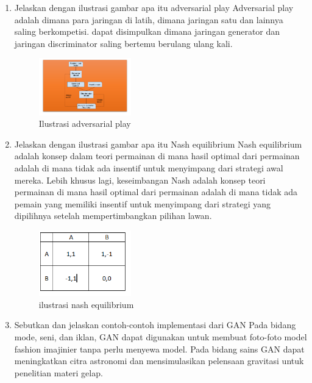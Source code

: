 \begin{enumerate}
	\item Jelaskan dengan ilustrasi gambar apa itu adversarial play
	\hfill\break
	Adversarial play adalah dimana para jaringan di latih, dimana jaringan satu dan lainnya saling berkompetisi. dapat disimpulkan dimana jaringan generator dan jaringan discriminator saling bertemu berulang ulang kali.
	\begin{figure}[H]
	    \centering
	    \includegraphics[width=4cm]{figures/1174096/tugas8/t6.PNG}
	    \caption{Ilustrasi adversarial play}
    \end{figure}

    \item  Jelaskan dengan ilustrasi gambar apa itu Nash equilibrium
    \hfill\break
    Nash equilibrium adalah konsep dalam teori permainan di mana hasil optimal dari permainan adalah di mana tidak ada insentif untuk menyimpang dari strategi awal mereka. Lebih khusus lagi, keseimbangan Nash adalah konsep teori permainan di mana hasil optimal dari permainan adalah di mana tidak ada pemain yang memiliki insentif untuk menyimpang dari strategi yang dipilihnya setelah mempertimbangkan pilihan lawan.
    \begin{figure}[H]
	    \centering
	    \includegraphics[width=4cm]{figures/1174096/tugas8/t7.PNG}
	    \caption{ilustrasi nash equilibrium}
    \end{figure}

    \item Sebutkan dan jelaskan contoh-contoh implementasi dari GAN
    \hfill\break
    Pada bidang mode, seni, dan iklan, GAN dapat digunakan untuk membuat foto-foto model fashion imajinier tanpa perlu menyewa model. Pada bidang sains GAN dapat meningkatkan citra astronomi dan mensimulasikan pelensaan gravitasi untuk penelitian materi gelap.


\end{enumerate}

